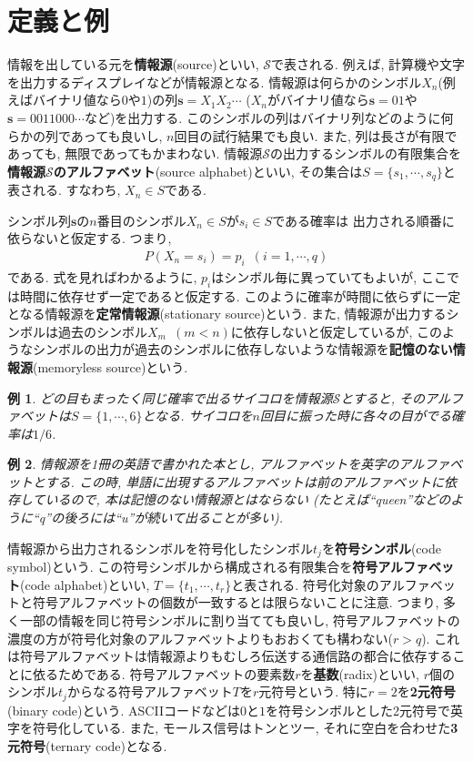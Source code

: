 \documentclass[12pt]{ltjsarticle}
\newtheorem{example}{例}
\begin{document}
\section{定義と例}
情報を出している元を\textbf{情報源}(source)といい, $\mathcal{S}$で表される.
例えば, 計算機や文字を出力するディスプレイなどが情報源となる.
情報源は何らかのシンボル$X_n$(例えばバイナリ値なら$0$や$1$)の列$\boldsymbol{s} = X_1 X_2 \cdots$
($X_n$がバイナリ値なら$\boldsymbol{s} = 01$や$\boldsymbol{s} = 0011000\cdots$など)を出力する.
このシンボルの列はバイナリ列などのように何らかの列であっても良いし, $n$回目の試行結果でも良い.
また, 列は長さが有限であっても, 無限であってもかまわない.
情報源$\mathcal{S}$の出力するシンボルの有限集合を\textbf{情報源$\mathcal{S}$のアルファベット}(source alphabet)といい,
その集合は$S = \{s_1, \cdots, s_q\}$と表される.
すなわち, $X_n \in S$である.

シンボル列$\boldsymbol{s}$の$n$番目のシンボル$X_n \in S$が$s_i \in S$である確率は
出力される順番に依らないと仮定する.
つまり,
\begin{align*}
  P(X_n = s_i) = p_i \enspace (i = 1, \cdots, q)
\end{align*}
である.
式を見ればわかるように, $p_i$はシンボル毎に異っていてもよいが, ここでは時間に依存せず一定であると仮定する.
このように確率が時間に依らずに一定となる情報源を\textbf{定常情報源}(stationary source)という.
また, 情報源が出力するシンボルは過去のシンボル$X_m \enspace (m < n)$に依存しないと仮定しているが,
このようなシンボルの出力が過去のシンボルに依存しないような情報源を\textbf{記憶のない情報源}(memoryless source)という.
\begin{example}
  どの目もまったく同じ確率で出るサイコロを情報源$\mathcal{S}$とすると,
  そのアルファベットは$S = \{1, \cdots, 6\}$となる.
  サイコロを$n$回目に振った時に各々の目がでる確率は$1/6$.
\end{example}
\begin{example}
  情報源を1冊の英語で書かれた本とし, アルファベットを英字のアルファベットとする.
  この時, 単語に出現するアルファベットは前のアルファベットに依存しているので, 本は記憶のない情報源とはならない
  (たとえば``queen''などのように``q''の後ろには``u''が続いて出ることが多い).
\end{example}
\noindent

情報源から出力されるシンボルを符号化したシンボル$t_j$を\textbf{符号シンボル}(code symbol)という.
この符号シンボルから構成される有限集合を\textbf{符号アルファベット}(code alphabet)といい,
$T = \{t_1, \cdots, t_r\}$と表される.
符号化対象のアルファベットと符号アルファベットの個数が一致するとは限らないことに注意.
つまり, 多く一部の情報を同じ符号シンボルに割り当てても良いし,
符号アルファベットの濃度の方が符号化対象のアルファベットよりもおおくても構わない($r > q$).
これは符号アルファベットは情報源よりもむしろ伝送する通信路の都合に依存することに依るためである.
符号アルファベットの要素数$r$を\textbf{基数}(radix)といい,
$r$個のシンボル$t_j$からなる符号アルファベット$T$を$r$元符号という.
特に$r = 2$を\textbf{2元符号}(binary code)という.
ASCIIコードなどは$0$と$1$を符号シンボルとした2元符号で英字を符号化している.
また, モールス信号はトンとツー, それに空白を合わせた\textbf{3元符号}(ternary code)となる.
\end{document}
